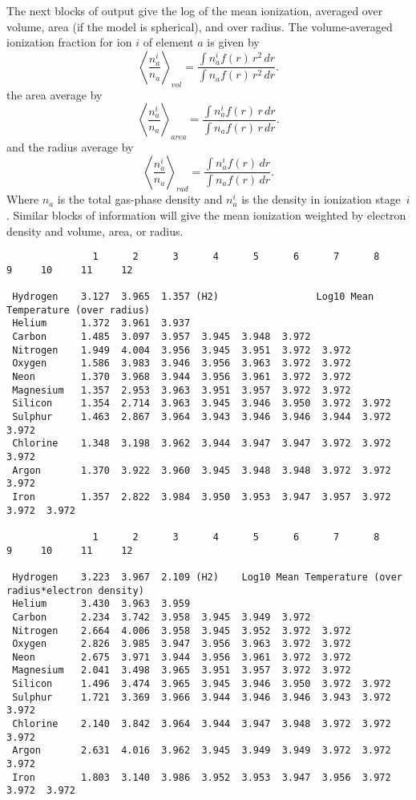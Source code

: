 The next blocks of output give the log of the mean ionization, averaged
over volume, area (if the model is spherical), and over radius.
The
volume-averaged ionization fraction for ion $i$ of element $a$ is given by
\begin{equation}
\left\langle \frac{n_a^i}{n_a}\right\rangle_{vol}
= \frac{\int n_a^i f (r)\,r^2\,dr}{\int n_af(r)\,r^2\, dr}.%
\end{equation}
the area average by
\begin{equation}
\left\langle \frac{n_a^i}{n_a}\right\rangle_{area}
= \frac{\int n_a^i f (r)\,r\,dr}{\int n_af(r)\,r\, dr}.
\end{equation}
and the radius average by
\begin{equation}
\left\langle \frac{n_a^i}{n_a}\right\rangle_{rad}
= \frac{\int n_a^i f (r)\,dr}{\int n_af(r)\, dr}.%
\end{equation}
Where $n_a$ is the total gas-phase density and
$n_a^i$ is the density in ionization
stage~$i$.
Similar blocks of information will give the mean ionization
weighted by electron density and volume, area, or radius.

{\setverbatimfontsize{\tiny}
\begin{verbatim}
               1      2      3      4      5      6      7      8      9     10     11     12

 Hydrogen    3.127  3.965  1.357 (H2)                 Log10 Mean Temperature (over radius)
 Helium      1.372  3.961  3.937
 Carbon      1.485  3.097  3.957  3.945  3.948  3.972
 Nitrogen    1.949  4.004  3.956  3.945  3.951  3.972  3.972
 Oxygen      1.586  3.983  3.946  3.956  3.963  3.972  3.972
 Neon        1.370  3.968  3.944  3.956  3.961  3.972  3.972
 Magnesium   1.357  2.953  3.963  3.951  3.957  3.972  3.972
 Silicon     1.354  2.714  3.963  3.945  3.946  3.950  3.972  3.972
 Sulphur     1.463  2.867  3.964  3.943  3.946  3.946  3.944  3.972  3.972
 Chlorine    1.348  3.198  3.962  3.944  3.947  3.947  3.972  3.972  3.972
 Argon       1.370  3.922  3.960  3.945  3.948  3.948  3.972  3.972  3.972
 Iron        1.357  2.822  3.984  3.950  3.953  3.947  3.957  3.972  3.972  3.972

               1      2      3      4      5      6      7      8      9     10     11     12

 Hydrogen    3.223  3.967  2.109 (H2)    Log10 Mean Temperature (over radius*electron density)
 Helium      3.430  3.963  3.959
 Carbon      2.234  3.742  3.958  3.945  3.949  3.972
 Nitrogen    2.664  4.006  3.958  3.945  3.952  3.972  3.972
 Oxygen      2.826  3.985  3.947  3.956  3.963  3.972  3.972
 Neon        2.675  3.971  3.944  3.956  3.961  3.972  3.972
 Magnesium   2.041  3.498  3.965  3.951  3.957  3.972  3.972
 Silicon     1.496  3.474  3.965  3.945  3.946  3.950  3.972  3.972
 Sulphur     1.721  3.369  3.966  3.944  3.946  3.946  3.943  3.972  3.972
 Chlorine    2.140  3.842  3.964  3.944  3.947  3.948  3.972  3.972  3.972
 Argon       2.631  4.016  3.962  3.945  3.949  3.949  3.972  3.972  3.972
 Iron        1.803  3.140  3.986  3.952  3.953  3.947  3.956  3.972  3.972  3.972
\end{verbatim}
}

